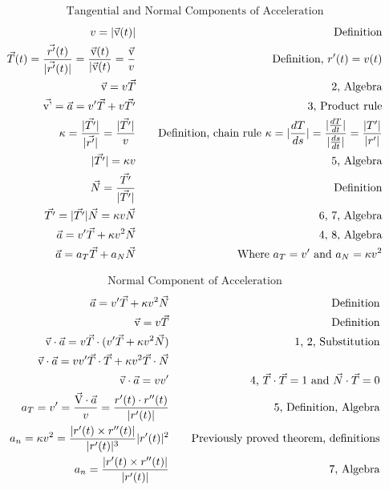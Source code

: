 \documentclass{article}
\begin{document}
\begin{gather*}
    \text{Tangential and Normal Components of Acceleration}
\end{gather*}
\begin{alignat}{2}
\setcounter{equation}{0}
    v=|\Vec{\text{v}}(t)|                           &\quad &\text{Definition}
    \\
    \Vec{T}(t)=\frac{\Vec{r'}(t)}{|\Vec{r'}(t)|}=\frac{\Vec{\text{v}}(t)}{|\Vec{\text{v}}(t)}=\frac{\Vec{\text{v}}}{v}                &\quad &\text{Definition, }r'(t)=v(t)
    \\
    \Vec{\text{v}}=v\Vec{T}                         &\quad &\text{2, Algebra}
    \\
    \Vec{\text{v'}}=\Vec{a}=v'\Vec{T}+v\Vec{T'}     &\quad &\text{3, Product rule}
    \\
    \kappa=\frac{|\Vec{T'}|}{|\Vec{r'}|}=\frac{|\Vec{T'}|}{v}    &\quad &\text{Definition, chain rule }\kappa=|\frac{dT}{ds}|=\frac{|\frac{dT}{dt}|}{|\frac{ds}{dt}|}=\frac{|T'|}{|r'|}
    \\
    |\Vec{T'}|=\kappa v                             &\quad &\text{5, Algebra}
    \\
    \Vec{N}=\frac{\Vec{T'}}{|\vec{T'}|}                   &\quad &\text{Definition}
    \\
    \vec{T'}=|\vec{T'}|\vec{N}=\kappa v\vec{N}      &\quad &\text{6, 7, Algebra}
    \\
    \vec{a}=v'\vec{T}+\kappa v^2\vec{N}             &\quad &\text{4, 8, Algebra}
    \\
    \vec{a}=a_T\vec{T}+a_N\vec{N}                   &\quad &\text{Where }a_T=v'\text{ and }a_N=\kappa v^2
\end{alignat}

\begin{gather*}
    \text{Normal Component of Acceleration}
\end{gather*}
\begin{alignat}{2}
\setcounter{equation}{0}
    \Vec{a}=v'\Vec{T}+\kappa v^2\Vec{N}              &\quad &\text{Definition}
    \\
    \Vec{\text{v}}=v\Vec{T}                         &\quad &\text{Definition}
    \\
    \Vec{\text{v}}\cdot\Vec{a}=v\Vec{T}\cdot(v'\Vec{T}+\kappa v^2\Vec{N})   &\quad &\text{1, 2, Substitution}
    \\
    \Vec{\text{v}}\cdot \Vec{a}=vv'\Vec{T}\cdot\Vec{T}+\kappa v^2\Vec{T}\cdot\Vec{N}
    \\
    \Vec{\text{v}}\cdot\Vec{a}=vv'                  &\quad &\text{4, }\Vec{T}\cdot\Vec{T}=1\text{ and }\Vec{N}\cdot\Vec{T}=0
    \\
    a_T=v'=\frac{\Vec{\text{V}}\cdot\Vec{a}}{v}=\frac{r'(t)\cdot r''(t)}{|r'(t)|}   &\quad &\text{5, Definition, Algebra}
    \\
    a_n=\kappa v^2=\frac{|r'(t)\times r''(t)|}{|r'(t)|^3}|r'(t)|^2  &\quad &\text{Previously proved theorem, definitions}
    \\
    a_n=\frac{|r'(t)\times r''(t)|}{|r'(t)|}        &\quad &\text{7, Algebra}
\end{alignat}
\end{document}

